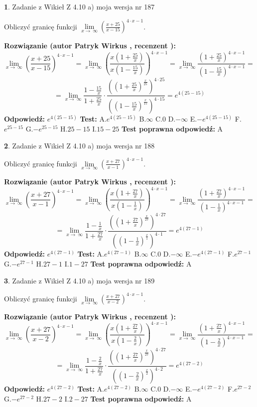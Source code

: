 \documentclass[12pt, a4paper]{article}
\theoremstyle{definition} %
\newtheorem{zad}{}
\newcommand{\zadStart}[1]{\begin{zad}#1\newline}
\newcommand{\zadStop}{\end{zad}}
\newcommand{\rozwStart}[2]{\noindent \textbf{Rozwiązanie (autor #1 , recenzent #2): }\newline}
\newcommand{\rozwStop}{\newline}
\newcommand{\odpStart}{\noindent \textbf{Odpowiedź:}\newline}
\newcommand{\odpStop}{\newline}
\newcommand{\testStart}{\noindent \textbf{Test:}\newline}
\newcommand{\testStop}{\newline}
\newcommand{\kluczStart}{\noindent \textbf{Test poprawna odpowiedź:}\newline}
\newcommand{\kluczStop}{\newline}
\begin{document}
\zadStart{Zadanie z Wikieł Z 4.10 a) moja wersja nr 187}


Obliczyć granicę funkcji  $\lim\limits_{x\to\ \infty}(\frac{x+25}{x-15})^{4\cdot x-1}$.
\zadStop
\rozwStart{Patryk Wirkus}{}
$$\lim\limits_{x\to\ \infty}(\frac{x+25}{x-15})^{4\cdot x-1} = \lim\limits_{x\to\ \infty}(\frac{x(1+\frac{25}{x})}{x(1-\frac{15}{x})})^{4\cdot x-1}=\lim\limits_{x\to\ \infty}\frac{(1+\frac{25}{x})^{4\cdot x-1}}{(1-\frac{15}{x})^{4\cdot x-1}}=$$
$$=\lim\limits_{x\to\ \infty}\frac{1-\frac{15}{x}}{1+\frac{25}{x}}\cdot\frac{((1+\frac{25}{x})^{\frac{x}{25}})^{4\cdot25}}{((1-\frac{15}{x})^{\frac{x}{15}})^{4\cdot15}}=e^{4(25-15)}$$
\rozwStop
\odpStart
$e^{4(25-15)}$
\odpStop
\testStart
A.$e^{4(25-15)}$ B.$\infty$ C.$0$ D.$-\infty$ E.$-e^{4(25-15)}$
F.$e^{25-15}$ G.$-e^{25-15}$
H.$25-15$
I.$15-25$
\testStop
\kluczStart
A
\kluczStop



\zadStart{Zadanie z Wikieł Z 4.10 a) moja wersja nr 188}


Obliczyć granicę funkcji  $\lim\limits_{x\to\ \infty}(\frac{x+27}{x-1})^{4\cdot x-1}$.
\zadStop
\rozwStart{Patryk Wirkus}{}
$$\lim\limits_{x\to\ \infty}(\frac{x+27}{x-1})^{4\cdot x-1} = \lim\limits_{x\to\ \infty}(\frac{x(1+\frac{27}{x})}{x(1-\frac{1}{x})})^{4\cdot x-1}=\lim\limits_{x\to\ \infty}\frac{(1+\frac{27}{x})^{4\cdot x-1}}{(1-\frac{1}{x})^{4\cdot x-1}}=$$
$$=\lim\limits_{x\to\ \infty}\frac{1-\frac{1}{x}}{1+\frac{27}{x}}\cdot\frac{((1+\frac{27}{x})^{\frac{x}{27}})^{4\cdot27}}{((1-\frac{1}{x})^{\frac{x}{1}})^{4\cdot1}}=e^{4(27-1)}$$
\rozwStop
\odpStart
$e^{4(27-1)}$
\odpStop
\testStart
A.$e^{4(27-1)}$ B.$\infty$ C.$0$ D.$-\infty$ E.$-e^{4(27-1)}$
F.$e^{27-1}$ G.$-e^{27-1}$
H.$27-1$
I.$1-27$
\testStop
\kluczStart
A
\kluczStop



\zadStart{Zadanie z Wikieł Z 4.10 a) moja wersja nr 189}


Obliczyć granicę funkcji  $\lim\limits_{x\to\ \infty}(\frac{x+27}{x-2})^{4\cdot x-1}$.
\zadStop
\rozwStart{Patryk Wirkus}{}
$$\lim\limits_{x\to\ \infty}(\frac{x+27}{x-2})^{4\cdot x-1} = \lim\limits_{x\to\ \infty}(\frac{x(1+\frac{27}{x})}{x(1-\frac{2}{x})})^{4\cdot x-1}=\lim\limits_{x\to\ \infty}\frac{(1+\frac{27}{x})^{4\cdot x-1}}{(1-\frac{2}{x})^{4\cdot x-1}}=$$
$$=\lim\limits_{x\to\ \infty}\frac{1-\frac{2}{x}}{1+\frac{27}{x}}\cdot\frac{((1+\frac{27}{x})^{\frac{x}{27}})^{4\cdot27}}{((1-\frac{2}{x})^{\frac{x}{2}})^{4\cdot2}}=e^{4(27-2)}$$
\rozwStop
\odpStart
$e^{4(27-2)}$
\odpStop
\testStart
A.$e^{4(27-2)}$ B.$\infty$ C.$0$ D.$-\infty$ E.$-e^{4(27-2)}$
F.$e^{27-2}$ G.$-e^{27-2}$
H.$27-2$
I.$2-27$
\testStop
\kluczStart
A
\kluczStop
\end{document}
